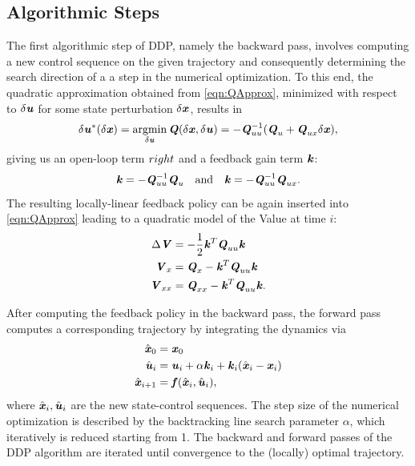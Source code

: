 \subsection{Algorithmic Steps}
The first algorithmic step of \gls{DDP}, namely the backward pass, involves computing a new control sequence on the given trajectory and consequently determining the search direction of a a step in the numerical optimization. To this end, the quadratic approximation obtained from \cref{eqn:QApprox}, minimized with respect to $\delta\bm{\mathit{u}}$ for some state perturbation $\delta\bm{\mathit{x}}$, results in
\begin{equation*}
\delta\bm{\mathit{u}}^*(\delta\bm{\mathit{x}})=\operatorname*{argmin}_{\delta\bm{\mathit{u}}}\bm{\mathit{Q}}(\delta\bm{\mathit{x}},\delta\bm{\mathit{u}})=-\bm{\mathit{Q}}_{uu}^{-1}(\bm{\mathit{Q}}_{u}+\bm{\mathit{Q}}_{ux}\delta\bm{\mathit{x}}),
\end{equation*}
giving us an open-loop term $\\right $ and a feedback gain term $\bm{\mathit{k}}$:
\begin{equation*}
\bm{\mathit{k}}=-\bm{\mathit{Q}}_{uu}^{-1}\bm{\mathit{Q}}_{u}\quad \text{and} \quad \bm{\mathit{k}}=-\bm{\mathit{Q}}_{uu}^{-1}\bm{\mathit{Q}}_{ux}.
\end{equation*}
The resulting locally-linear feedback policy can be again inserted into \cref{eqn:QApprox} leading to a quadratic model of the Value at time $i$: 
\begin{align*}
 \Delta \bm{\mathit{V}} &= -\dfrac{1}{2}\bm{\mathit{k}}^T\bm{\mathit{Q}}_{uu}\bm{\mathit{k}} \\
 \bm{\mathit{V}}_{x} &= \bm{\mathit{Q}}_{x}-\bm{\mathit{k}}^T\bm{\mathit{Q}}_{uu}\bm{\mathit{k}} \\
 \bm{\mathit{V}}_{xx} &= \bm{\mathit{Q}}_{xx}-\bm{\mathit{k}}^T\bm{\mathit{Q}}_{uu}\bm{\mathit{k}}.
\end{align*}

After computing the feedback policy in the backward pass, the forward pass computes a corresponding trajectory by integrating the dynamics via
\begin{align*}
\hat{\bm{\mathit{x}}}_0 		&=\bm{\mathit{x}}_0 \\
\hat{\bm{\mathit{u}}}_i 		&=\bm{\mathit{u}}_i+\alpha\bm{\mathit{k}}_i+\bm{\mathit{k}}_i(\hat{\bm{\mathit{x}}}_i-\bm{\mathit{x}}_i) \\
\hat{\bm{\mathit{x}}}_{i+1}	&=\bm{\mathit{f}}(\hat{\bm{\mathit{x}}}_i,\hat{\bm{\mathit{u}}}_i),
\end{align*}
where $\hat{\bm{\mathit{x}}}_i,\hat{\bm{\mathit{u}}}_i$ are the new state-control sequences. The step size of the numerical optimization is described by the backtracking line search parameter $\alpha$, which iteratively is reduced starting from 1. The backward and forward passes of the \gls{DDP} algorithm are iterated until convergence to the (locally) optimal trajectory.  


